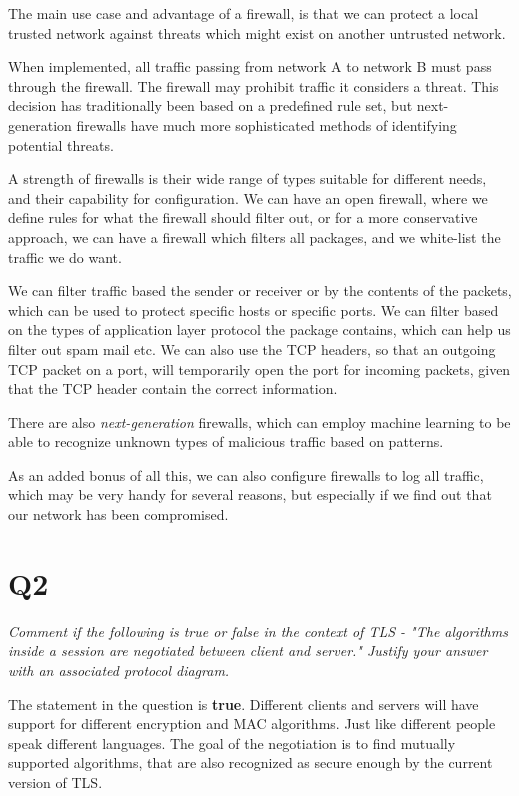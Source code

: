 \documentclass{article}
\begin{document}
The main use case and advantage of a firewall, is that we can protect a local trusted network against threats which might exist on another untrusted network.

When implemented, all traffic passing from network A to network B must pass through the firewall. The firewall may prohibit traffic it considers a threat. This decision has traditionally been based on a predefined rule set, but next-generation firewalls have much more sophisticated methods of identifying potential threats.

A strength of firewalls is their wide range of types suitable for different needs, and their capability for configuration. We can have an open firewall, where we define rules for what the firewall should filter out, or for a more conservative approach, we can have a firewall which filters all packages, and we white-list the traffic we do want.

We can filter traffic based the sender or receiver or by the contents of the packets, which can be used to protect specific hosts or specific ports. We can filter based on the types of application layer protocol the package contains, which can help us filter out spam mail etc. We can also use the TCP headers, so that an outgoing TCP packet on a port, will temporarily open the port for incoming packets, given that the TCP header contain the correct information.

There are also \textit{next-generation} firewalls, which can employ machine learning to be able to recognize unknown types of malicious traffic based on patterns.

As an added bonus of all this, we can also configure firewalls to log all traffic, which may be very handy for several reasons, but especially if we find out that our network has been compromised.


\newpage
\section{Q2}
\begin{tcolorbox}
  \textit{Comment if the following is true or false in the context of TLS - "The algorithms inside a session are negotiated between client and server." Justify your answer with an associated protocol diagram.}
\end{tcolorbox}
The statement in the question is \textbf{true}. Different clients and servers will have support for different encryption and MAC algorithms. Just like different people speak different languages. The goal of the negotiation is to find mutually supported algorithms, that are also recognized as secure enough by the current version of TLS.
\end{document}

